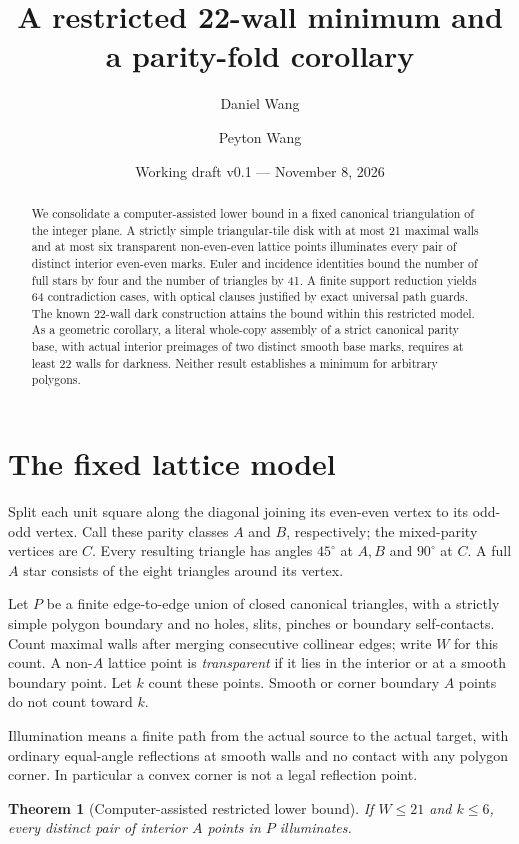\documentclass[11pt]{article}
\title{A restricted 22-wall minimum and a parity-fold corollary}
\author{Daniel Wang \and Peyton Wang}
\date{Working draft v0.1 --- November 8, 2026}
\newtheorem{theorem}{Theorem}[section]
\theoremstyle{definition}
\begin{document}
\maketitle
\begin{abstract}
We consolidate a computer-assisted lower bound in a fixed canonical triangulation of the integer plane. A strictly simple triangular-tile disk with at most 21 maximal walls and at most six transparent non-even-even lattice points illuminates every pair of distinct interior even-even marks. Euler and incidence identities bound the number of full stars by four and the number of triangles by 41. A finite support reduction yields 64 contradiction cases, with optical clauses justified by exact universal path guards. The known 22-wall dark construction attains the bound within this restricted model. As a geometric corollary, a literal whole-copy assembly of a strict canonical parity base, with actual interior preimages of two distinct smooth base marks, requires at least 22 walls for darkness. Neither result establishes a minimum for arbitrary polygons.
\end{abstract}

\section{The fixed lattice model}
Split each unit square along the diagonal joining its even-even vertex to its odd-odd vertex. Call these parity classes $A$ and $B$, respectively; the mixed-parity vertices are $C$. Every resulting triangle has angles $45^\circ$ at $A,B$ and $90^\circ$ at $C$. A full $A$ star consists of the eight triangles around its vertex.

Let $P$ be a finite edge-to-edge union of closed canonical triangles, with a strictly simple polygon boundary and no holes, slits, pinches or boundary self-contacts. Count maximal walls after merging consecutive collinear edges; write $W$ for this count. A non-$A$ lattice point is \emph{transparent} if it lies in the interior or at a smooth boundary point. Let $k$ count these points. Smooth or corner boundary $A$ points do not count toward $k$.

Illumination means a finite path from the actual source to the actual target, with ordinary equal-angle reflections at smooth walls and no contact with any polygon corner. In particular a convex corner is not a legal reflection point.

\begin{theorem}[Computer-assisted restricted lower bound]\label{thm:minimum}
If $W\le21$ and $k\le6$, every distinct pair of interior $A$ points in $P$ illuminates.
\end{theorem}
\end{document}
